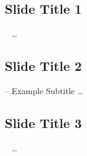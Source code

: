 \subsection{Slide Title 1}
\begin{frame}{~}
	\ldots
\end{frame}

\subsection{Slide Title 2}
\begin{frame}{-- Example Subtitle}
	\ldots
\end{frame}

\subsection{Slide Title 3}
\begin{frame}{~}
	\ldots
\end{frame}

